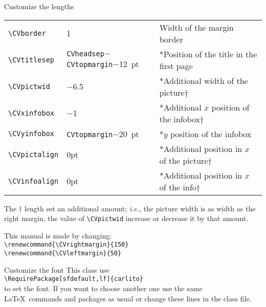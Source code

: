 \documentclass[english]{michael-cv}
\begin{document}
\begin{para}{Customize the lengths}
\begin{tabular}{llp{140pt}}
\verb+\CVborder+	& 1			& Width of the margin border	\\
\verb+\CVtitlesep+	& \texttt{CVheadsep}$-$\texttt{CVtopmargin}$-$12~pt	& *Position of the title in the first page	\\
\verb+\CVpictwid+	& $-$6.5		& *Additional width of the picture$\dagger$	\\
\verb+\CVxinfobox+	& $-$1 & *Additional $x$ position of the infobox$\dagger$	\\
\verb+\CVyinfobox+	& \texttt{CVtopmargin}$-$20~pt		& *$y$ position of the infobox	\\
\verb+\CVpictalign+	& 0pt			& *Additional position in $x$ of the picture$\dagger$\\
\verb+\CVinfoalign+	& 0pt			& *Additional position in $x$ of the info$\dagger$\\
\bottomrule
\end{tabular}

\vspace{2ex}
The $\dagger$ length set an additional amount; \textit{i.e.}, the picture width is as width as the right margin, the value of \verb+\CVpictwid+ increase or decrease it by that amount.

\vspace{2ex}
This manual is made by changing:\\
\null\hspace{4ex}\verb+\renewcommand{\CVrightmargin}{150}+\\[-2ex]
\null\hspace{4ex}\verb+\renewcommand{\CVleftmargin}{50}+
\end{para}

\newpage
\begin{para}{Customize the font}
This class use\\[1ex]
\verb+\RequirePackage[sfdefault,lf]{carlito}+\\
to set the font. If you want to choose another one use the same \LaTeX\ commands and packages as usual or change these lines in the class file.
\end{para}
\end{document}
